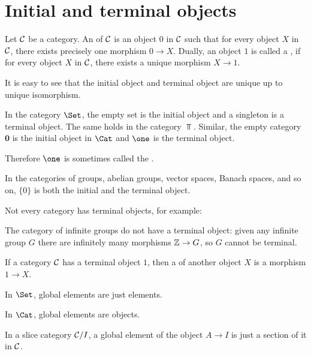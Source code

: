 \newpage\section{Initial and terminal objects}
  \begin{defn}\label{def:universal-object}
    Let ${\cal C}$ be a category. An  of ${\cal C}$ is an object $0$ in ${\cal C}$ such that for every object $X$ in ${\cal C}$, there exists precisely one morphism $0\to X$.
    Dually, an object $1$ is called a , if for every object $X$ in ${\cal C}$, there exists a unique morphism $X\to 1$.
  \end{defn}
  \begin{rem}
    It is easy to see that the initial object and terminal object are unique up to unique isomorphism.
  \end{rem}

  \begin{exam}
    In the category $\Set$, the empty set is the initial object and a singleton is a terminal object. The same holds in the category $\Top$. Similar, the empty category $\mathbf{0}$ is the initial object in $\Cat$ and $\one$ is the terminal object.
  \end{exam}
  \begin{rem}
    Therefore $\one$ is sometimes called the .
  \end{rem}
  \begin{exam}
    In the categories of groups, abelian groups, vector spaces, Banach spaces, and so on, $\{0\}$ is both the initial and the terminal object.
  \end{exam}

  Not every category has terminal objects, for example:
  \begin{exam}
    The category of infinite groups do not have a terminal object: given any infinite group $G$ there are infinitely many morphisms ${\mathbb Z}\to G$, so $G$ cannot be terminal.
  \end{exam}

  \begin{defn}
    If a category ${\cal C}$ has a terminal object $1$, then a  of another object $X$ is a morphism $1\to X$.
  \end{defn}
  \begin{exam}
    In $\Set$, global elements are just elements.
  \end{exam}
  \begin{exam}
    In $\Cat$, global elements are objects.
  \end{exam}
  \begin{exam}
    In a slice category ${\cal C}/I$, a global element of the object $A\to I$ is just a section of it in ${\cal C}$.
  \end{exam}


